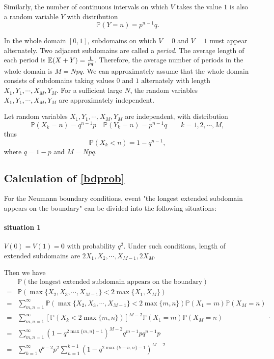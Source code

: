 \documentclass[a4paper,11pt]{article}
\begin{document}
\begin{appendices}
Similarly, the number of continuous intervals on which $V$ takes the value $1$ is also a random variable $Y$ with distribution
$$ \mathbb{P}(Y = n) = p^{n-1} q. $$

In the whole domain $[0, 1]$, subdomains on which $V = 0$ and $V = 1$ must appear alternately. Two adjacent subdomains are called a \emph{period}. The average length of each period is $\mathbb{E}(X + Y) = \frac{1}{p q}$. Therefore, the average number of periods in the whole domain is $M = N p q$. We can approximately assume that the whole domain consists of subdomains taking values $0$ and $1$ alternately with length $X_1, Y_1, \cdots, X_M, Y_M$. For a sufficient large $N$, the random variables $X_1, Y_1, \cdots, X_M, Y_M$ are approximately independent.

Let random variables $X_1, Y_1, \cdots, X_M, Y_M$ are independent, with distribution
$$ \mathbb{P}(X_k = n) = q^{n-1} p \quad \mathbb{P}(Y_k = n) = p^{n-1} q \qquad k = 1, 2, \cdots, M, $$
thus
$$ \mathbb{P}(X_k < n) = 1 - q^{n-1}, $$
where $q = 1 - p$ and $M = N p q$.

\subsection{Calculation of \eqref{bdprob}}\label{appB1}

For the Neumann boundary conditions, event "the longest extended subdomain appears on the boundary" can be divided into the following situations:

\paragraph*{situation 1}
$V(0) = V(1) = 0$ with probability $q^2$. Under such conditions, length of extended subdomains are $2 X_1, X_2, \cdots, X_{M-1}, 2 X_M$.

Then we have
\begin{equation*}
\begin{split}
  & \mathbb{P}(\text{the longest extended subdomain appears on the boundary}) \\
= & \mathbb{P}(\max\{X_2, X_3, \cdots, X_{M-1}\} < 2 \max\{X_1, X_M\}) \\
= & \sum_{m,n=1}^{\infty} \mathbb{P}(\max\{X_2, X_3, \cdots, X_{M-1}\} < 2 \max\{m,  n\}) \mathbb{P}(X_1 = m) \mathbb{P}(X_M = n) \\
= & \sum_{m,n=1}^{\infty} [\mathbb{P}(X_k < 2 \max\{m,n\}) ]^{M-2} \mathbb{P}(X_1 = m) \mathbb{P}(X_M = n)\\
= & \sum_{m,n=1}^{\infty} (1 - q^{2 \max\{m,n\}-1})^{M-2} q^{m-1} p q^{n-1} p\\
= & \sum_{k=1}^{\infty} q^{k-2} p^2 \sum_{n=1}^{k-1} (1 - q^{2 \max\{k-n,n\}-1})^{M-2} 
\end{split}.
\end{equation*}


\end{appendices}
\end{document}
